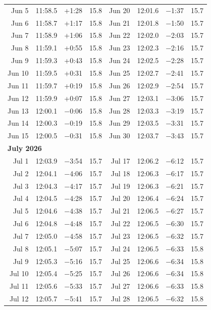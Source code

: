 {\begin{longtable}{r r r r | r r r r}
Jun 5 & 11:58.5 & +1:28 & 15.8 & Jun 20 & 12:01.6 & $-$1:37 & 15.7 \\
Jun 6 & 11:58.7 & +1:17 & 15.8 & Jun 21 & 12:01.8 & $-$1:50 & 15.7 \\
Jun 7 & 11:58.9 & +1:06 & 15.8 & Jun 22 & 12:02.0 & $-$2:03 & 15.7 \\
Jun 8 & 11:59.1 & +0:55 & 15.8 & Jun 23 & 12:02.3 & $-$2:16 & 15.7 \\
Jun 9 & 11:59.3 & +0:43 & 15.8 & Jun 24 & 12:02.5 & $-$2:28 & 15.7 \\
Jun 10 & 11:59.5 & +0:31 & 15.8 & Jun 25 & 12:02.7 & $-$2:41 & 15.7 \\
Jun 11 & 11:59.7 & +0:19 & 15.8 & Jun 26 & 12:02.9 & $-$2:54 & 15.7 \\
Jun 12 & 11:59.9 & +0:07 & 15.8 & Jun 27 & 12:03.1 & $-$3:06 & 15.7 \\
Jun 13 & 12:00.1 & $-$0:06 & 15.8 & Jun 28 & 12:03.3 & $-$3:19 & 15.7 \\
Jun 14 & 12:00.3 & $-$0:19 & 15.8 & Jun 29 & 12:03.5 & $-$3:31 & 15.7 \\
Jun 15 & 12:00.5 & $-$0:31 & 15.8 & Jun 30 & 12:03.7 & $-$3:43 & 15.7 \\
\multicolumn{8}{l}{\textbf{July 2026}}\\
Jul 1 & 12:03.9 & $-$3:54 & 15.7 & Jul 17 & 12:06.2 & $-$6:12 & 15.7 \\
Jul 2 & 12:04.1 & $-$4:06 & 15.7 & Jul 18 & 12:06.3 & $-$6:17 & 15.7 \\
Jul 3 & 12:04.3 & $-$4:17 & 15.7 & Jul 19 & 12:06.3 & $-$6:21 & 15.7 \\
Jul 4 & 12:04.5 & $-$4:28 & 15.7 & Jul 20 & 12:06.4 & $-$6:24 & 15.7 \\
Jul 5 & 12:04.6 & $-$4:38 & 15.7 & Jul 21 & 12:06.5 & $-$6:27 & 15.7 \\
Jul 6 & 12:04.8 & $-$4:48 & 15.7 & Jul 22 & 12:06.5 & $-$6:30 & 15.7 \\
Jul 7 & 12:05.0 & $-$4:58 & 15.7 & Jul 23 & 12:06.5 & $-$6:32 & 15.7 \\
Jul 8 & 12:05.1 & $-$5:07 & 15.7 & Jul 24 & 12:06.5 & $-$6:33 & 15.8 \\
Jul 9 & 12:05.3 & $-$5:16 & 15.7 & Jul 25 & 12:06.6 & $-$6:34 & 15.8 \\
Jul 10 & 12:05.4 & $-$5:25 & 15.7 & Jul 26 & 12:06.6 & $-$6:34 & 15.8 \\
Jul 11 & 12:05.6 & $-$5:33 & 15.7 & Jul 27 & 12:06.6 & $-$6:33 & 15.8 \\
Jul 12 & 12:05.7 & $-$5:41 & 15.7 & Jul 28 & 12:06.5 & $-$6:32 & 15.8 \\

\end{longtable}}
